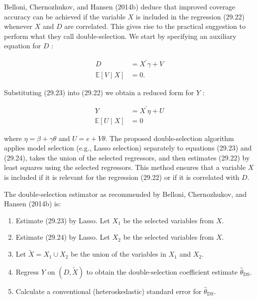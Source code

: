 \documentclass[10pt]{article}
\begin{document}
Belloni, Chernozhukov, and Hansen (2014b) deduce that improved coverage accuracy can be achieved if the variable $X$ is included in the regression (29.22) whenever $X$ and $D$ are correlated. This gives rise to the practical suggestion to perform what they call double-selection. We start by specifying an auxiliary equation for $D$ :

$$
\begin{aligned}
D &=X^{\prime} \gamma+V \\
\mathbb{E}[V \mid X] &=0 .
\end{aligned}
$$

Substituting (29.23) into (29.22) we obtain a reduced form for $Y$ :

$$
\begin{aligned}
Y &=X^{\prime} \eta+U \\
\mathbb{E}[U \mid X] &=0
\end{aligned}
$$

where $\eta=\beta+\gamma \theta$ and $U=e+V \theta$. The proposed double-selection algorithm applies model selection (e.g., Lasso selection) separately to equations (29.23) and (29.24), takes the union of the selected regressors, and then estimates (29.22) by least squares using the selected regressors. This method ensures that a variable $X$ is included if it is relevant for the regression (29.22) or if it is correlated with $D$.

The double-selection estimator as recommended by Belloni, Chernozhukov, and Hansen (2014b) is:

\begin{enumerate}
  \item Estimate (29.23) by Lasso. Let $X_{1}$ be the selected variables from $X$.

  \item Estimate (29.24) by Lasso. Let $X_{2}$ be the selected variables from $X$.

  \item Let $\widetilde{X}=X_{1} \cup X_{2}$ be the union of the variables in $X_{1}$ and $X_{2}$.

  \item Regress $Y$ on $(D, \widetilde{X})$ to obtain the double-selection coefficient estimate $\widehat{\theta}_{\mathrm{DS}}$.

  \item Calculate a conventional (heteroskedastic) standard error for $\widehat{\theta}_{\mathrm{DS}}$.

\end{enumerate}
\end{document}
